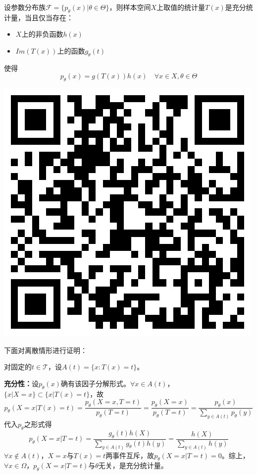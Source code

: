 \documentclass[UTF-8]{ctexbeamer}
\begin{document}
\begin{frame}
  \begin{Thm}
    设参数分布族$\mathscr{F}=\{p_{\theta}(x)|\theta\in \Theta\}$，则样本空间$X$上取值的统计量$T(x)$是充分统计量，当且仅当存在：
    \begin{itemize}
    \item $X$上的非负函数$h(x)$
    \item $Im(T(x))$上的函数$g_{\theta}(t)$
    \end{itemize}
    使得
    \[p_{\theta}(x)=g(T(x))h(x)\quad \forall x\in X,\theta\in \Theta\]
  \end{Thm}
  \includegraphics[scale=0.3]{sufficiency.png}
\end{frame}

\begin{frame}
  下面对离散情形进行证明：

  对固定的$t\in\mathscr{T}$，设$A(t)=\{x:T(x)=t\}$。

  \textbf{充分性：}设$p_{\theta}(x)$确有该因子分解形式。$\forall x\in A(t)$，$\{x|X=x\}\subset\{x|T(x)=t\}$，故
  \[p_{\theta}(X=x|T(x)=t)=\frac{p_{\theta}(X=x,T=t)}{p_{\theta}(T=t)}=\frac{p_{\theta}(X=x)}{p_{\theta}(T=t)}=\frac{p_{\theta}(x)}{\sum\limits_{y\in A(t)}p_{\theta}(y)}\]
  代入$p_{\theta}$之形式得
  \[p_{\theta}(X=x|T=t)=\frac{g_{\theta}(t)h(X)}{\sum\limits_{y\in A(t)}g_{\theta}(t)h(y)}=\frac{h(X)}{\sum\limits_{y\in A(t)}h(y)}\]
  $\forall x\not\in A(t)$，$X=x$与$T(x)=t$两事件互斥，故$p_{\theta}(X=x|T=t)=0$。综上，$\forall x\in\Omega$，$p_{\theta}(X=x|T=t)$与$\theta$无关，是充分统计量。
\end{frame}
\end{document}
